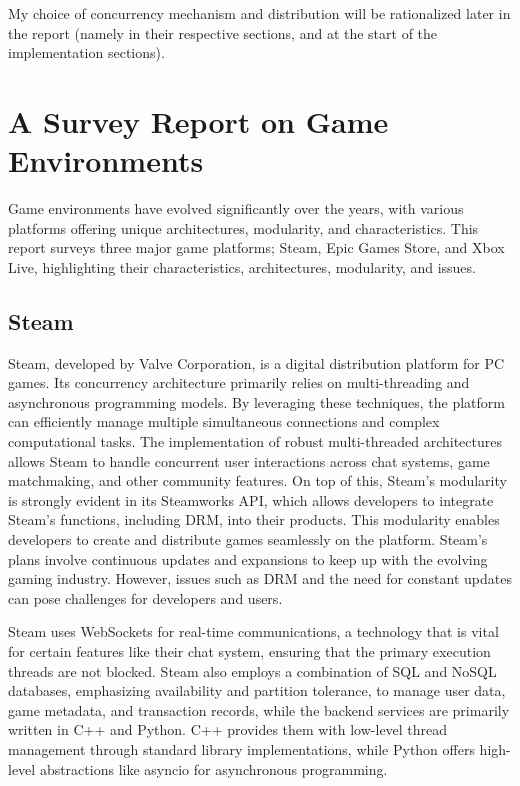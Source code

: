 \documentclass[]{final}
\begin{document}
My choice of concurrency mechanism and distribution will be
rationalized later in the report (namely in their respective sections,
and at the start of the implementation sections).

\chapter{A Survey Report on Game Environments}

Game environments have evolved significantly over the years, with various platforms
offering unique architectures, modularity, and characteristics. This report surveys
three major game platforms; Steam, Epic Games Store, and Xbox Live, highlighting
their characteristics, architectures, modularity, and issues.

\section{Steam}
Steam, developed by Valve Corporation, is a digital distribution platform
for PC games. Its concurrency architecture primarily relies on multi-threading and asynchronous
programming models. By leveraging these techniques, the platform can efficiently manage
multiple simultaneous connections and complex computational tasks. The implementation
of robust multi-threaded architectures allows Steam to handle concurrent user interactions
across chat systems, game matchmaking, and other community features. On top of this,
Steam's modularity is strongly evident in its Steamworks API, which allows developers to
integrate Steam's functions, including DRM, into their products.\cite{simmons_decoding_2023, noauthor_steamworks_nodate}
This modularity enables developers to create and distribute games seamlessly on the platform.
Steam's plans involve continuous updates and expansions to keep up with
the evolving gaming industry.\cite{noauthor_steam_nodate1} However, issues such as DRM and the need for
constant updates can pose challenges for developers and users\cite{noauthor_steam_nodate}.

Steam uses WebSockets for real-time communications, a technology that is vital
for certain features like their chat system, ensuring that the primary execution threads are not blocked.\cite{noauthor_isteamnetworkingsockets_nodate}
Steam also employs a combination of SQL and NoSQL databases\cite{simmons_decoding_2023, djundik_how_2017}, emphasizing availability
and partition tolerance, to manage user data, game metadata, and transaction records, while
the backend services are primarily written in C++ and Python.\cite{simmons_decoding_2023}  C++ provides them with low-level thread management through standard
library implementations, while Python offers high-level abstractions like asyncio
for asynchronous programming.
\end{document}
